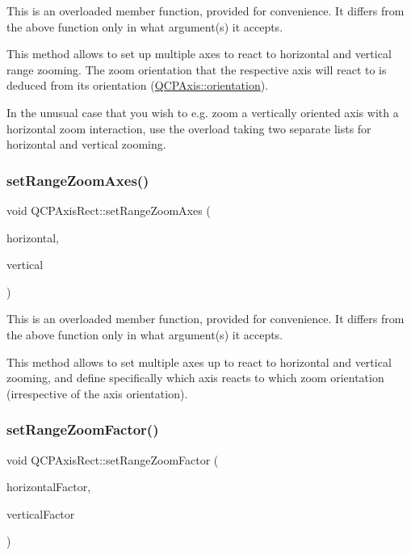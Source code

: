 This is an overloaded member function, provided for convenience. It differs from the above function only in what argument(s) it accepts.

This method allows to set up multiple axes to react to horizontal and vertical range zooming. The zoom orientation that the respective axis will react to is deduced from its orientation (\hyperlink{classQCPAxis_ab988ef4538e2655bb77bd138189cd42e}{Q\+C\+P\+Axis\+::orientation}).

In the unusual case that you wish to e.\+g. zoom a vertically oriented axis with a horizontal zoom interaction, use the overload taking two separate lists for horizontal and vertical zooming. \mbox{\label{classQCPAxisRect_ae85a63a856e111def77437812c3acc99}} 
\subsubsection{\texorpdfstring{set\+Range\+Zoom\+Axes()}{setRangeZoomAxes()}\hspace{0.1cm}{\footnotesize\ttfamily [3/3]}}
{\footnotesize\ttfamily void Q\+C\+P\+Axis\+Rect\+::set\+Range\+Zoom\+Axes (\begin{DoxyParamCaption}\item[{Q\+List$<$ \hyperlink{classQCPAxis}{Q\+C\+P\+Axis} $\ast$$>$}]{horizontal,  }\item[{Q\+List$<$ \hyperlink{classQCPAxis}{Q\+C\+P\+Axis} $\ast$$>$}]{vertical }\end{DoxyParamCaption})}

This is an overloaded member function, provided for convenience. It differs from the above function only in what argument(s) it accepts.

This method allows to set multiple axes up to react to horizontal and vertical zooming, and define specifically which axis reacts to which zoom orientation (irrespective of the axis orientation). \mbox{\label{classQCPAxisRect_a895d7ac745ea614e04056244b3c138ac}} 
\subsubsection{\texorpdfstring{set\+Range\+Zoom\+Factor()}{setRangeZoomFactor()}\hspace{0.1cm}{\footnotesize\ttfamily [1/2]}}
{\footnotesize\ttfamily void Q\+C\+P\+Axis\+Rect\+::set\+Range\+Zoom\+Factor (\begin{DoxyParamCaption}\item[{double}]{horizontal\+Factor,  }\item[{double}]{vertical\+Factor }\end{DoxyParamCaption})}

